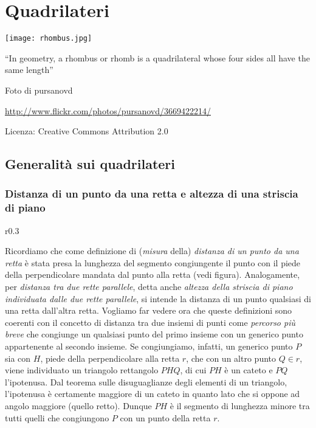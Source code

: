 
\chapter{Quadrilateri}\label{chap:quadrilateri}

\texttt{[image: rhombus.jpg]}
  \begin{center}
    {\large ``In geometry, a rhombus or rhomb is a quadrilateral whose four sides all have the same length''}\par
    Foto di pursanovd\par
    \url{http://www.flickr.com/photos/pursanovd/3669422214/}\par
    Licenza: Creative Commons Attribution 2.0\par
  \end{center}
\newpage

\section{Generalità sui quadrilateri}\label{sect:generalita_quadrilateri}

\subsection{Distanza di un punto da una retta e altezza di una striscia di piano}

\begin{wrapfigure}{r}{0.3\textwidth}
\centering
\end{wrapfigure}
Ricordiamo che come definizione di (\emph{misura} della) \emph{distanza di un punto da una retta} è stata presa la lunghezza del segmento congiungente il punto con il piede della perpendicolare mandata dal punto alla retta (vedi figura). Analogamente, per \emph{distanza tra due rette parallele}, detta anche \emph{altezza della striscia di piano individuata dalle due rette parallele}, si intende la distanza di un punto qualsiasi di una retta dall'altra retta. Vogliamo far vedere ora che queste definizioni sono coerenti con il concetto di distanza tra due insiemi di punti come \emph{percorso più breve} che congiunge un qualsiasi punto del primo insieme con un generico punto appartenente al secondo insieme. Se congiungiamo, infatti, un generico punto $P$ sia con $H$, piede della perpendicolare alla retta $r$, che con un altro punto $Q\in r$, viene individuato un triangolo rettangolo $PHQ$, di cui $PH$ è un cateto e $PQ$ l'ipotenusa. Dal teorema sulle disuguaglianze degli elementi di un triangolo, l'ipotenusa è certamente maggiore di un cateto in quanto lato che si oppone ad angolo maggiore (quello retto). Dunque $PH$ è il segmento di lunghezza minore tra tutti quelli che congiungono $P$ con un punto della retta $r$.

